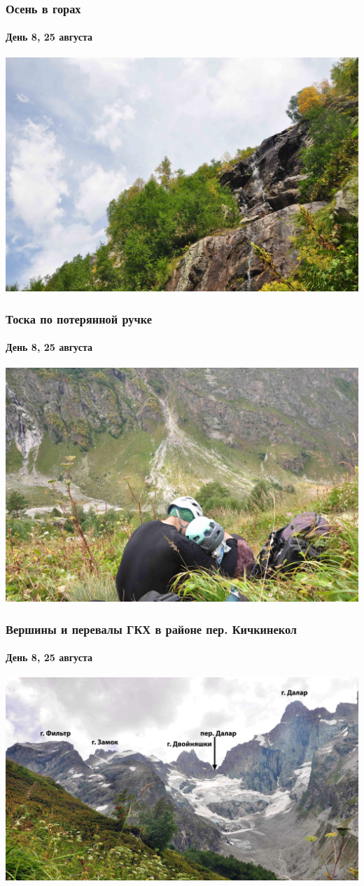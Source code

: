 \begin{frame}
	\frametitle{Осень в горах}
	\framesubtitle{День 8, 25 августа}
	\centering
	\includegraphics[width=\textwidth]{../pics/DSC_0149}			
\end{frame}

\begin{frame}
	\frametitle{Тоска по потерянной ручке}
	\framesubtitle{День 8, 25 августа}
	\centering
	\includegraphics[width=\textwidth]{../pics/DSC_0155}			
\end{frame}

\begin{frame}
	\frametitle{Вершины и перевалы ГКХ в районе пер. Кичкинекол}
	\framesubtitle{День 8, 25 августа}
	\centering
	\includegraphics[width=\textwidth]{../pics/DSC_0158}			
\end{frame}


